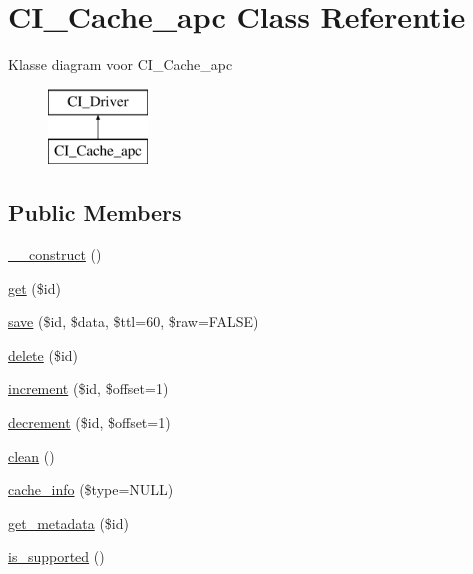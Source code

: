 \hypertarget{class_c_i___cache__apc}{}\section{C\+I\+\_\+\+Cache\+\_\+apc Class Referentie}
\label{class_c_i___cache__apc}
Klasse diagram voor C\+I\+\_\+\+Cache\+\_\+apc\begin{figure}[H]
\begin{center}
\leavevmode
\includegraphics[height=2.000000cm]{class_c_i___cache__apc}
\end{center}
\end{figure}
\subsection*{Public Members}
\begin{DoxyCompactItemize}
\item 
\mbox{\hyperlink{class_c_i___cache__apc_a095c5d389db211932136b53f25f39685}{\+\_\+\+\_\+construct}} ()
\item 
\mbox{\hyperlink{class_c_i___cache__apc_a50e3bfb586b2f42932a6a93f3fbb0828}{get}} (\$id)
\item 
\mbox{\hyperlink{class_c_i___cache__apc_a472645db04a8ce4b040b789a3062a7d2}{save}} (\$id, \$data, \$ttl=60, \$raw=F\+A\+L\+SE)
\item 
\mbox{\hyperlink{class_c_i___cache__apc_a2f8258add505482d7f00ea26493a5723}{delete}} (\$id)
\item 
\mbox{\hyperlink{class_c_i___cache__apc_a2f07a4e09b57f4460d49852497d1808f}{increment}} (\$id, \$offset=1)
\item 
\mbox{\hyperlink{class_c_i___cache__apc_a4eb1c2772c8efc48c411ea060dd040b7}{decrement}} (\$id, \$offset=1)
\item 
\mbox{\hyperlink{class_c_i___cache__apc_adb40b812890a8bc058bf6b7a0e1a54d9}{clean}} ()
\item 
\mbox{\hyperlink{class_c_i___cache__apc_aa8b9c4d9f0387156736ccd8850f0727e}{cache\+\_\+info}} (\$type=N\+U\+LL)
\item 
\mbox{\hyperlink{class_c_i___cache__apc_a59635cf18e997c5141bffa05ff7622e0}{get\+\_\+metadata}} (\$id)
\item 
\mbox{\hyperlink{class_c_i___cache__apc_a98c68fd153468bc148c4ed8c716859fc}{is\+\_\+supported}} ()
\end{DoxyCompactItemize}
